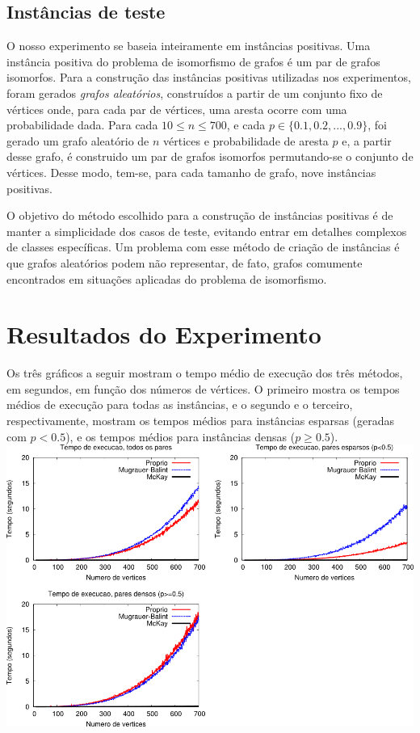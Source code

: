 \documentclass[12pt,a4paper]{article}
\begin{document}
\subsection{Instâncias de teste}

O nosso experimento se baseia inteiramente em instâncias positivas. Uma instância positiva do problema de isomorfismo de grafos é um 
par de grafos isomorfos. Para a construção das instâncias positivas utilizadas nos experimentos, foram gerados \textit{grafos 
aleatórios}, construídos a partir de um conjunto fixo de vértices onde, para cada par de vértices, uma aresta ocorre com uma 
probabilidade dada. Para cada $10 \le n \le 700$, e cada $p \in \{0.1,0.2,...,0.9\}$, foi gerado um grafo aleatório de $n$ vértices e 
probabilidade de aresta $p$ e, a partir desse grafo, é construido um par de grafos isomorfos permutando-se o conjunto de vértices. 
Desse modo, tem-se, para cada tamanho de grafo, nove instâncias positivas.

O objetivo do método escolhido para a construção de instâncias positivas é de manter a simplicidade dos casos de teste, evitando entrar 
em detalhes complexos de classes específicas. Um problema com esse método de criação de instâncias é que grafos aleatórios podem não 
representar, de fato, grafos comumente encontrados em situações aplicadas do problema de isomorfismo.

\section{Resultados do Experimento}

Os três gráficos a seguir mostram o tempo médio de execução dos três métodos, em segundos, em função dos números de vértices. O primeiro
mostra os tempos médios de execução para todas as instâncias, e o segundo e o terceiro, respectivamente, mostram os tempos médios para
instâncias esparsas (geradas com $p < 0.5$), e os tempos médios para instâncias densas ($p \ge 0.5$).\\

\includegraphics[scale=1.1]{fig1.png} \\
\end{document}
